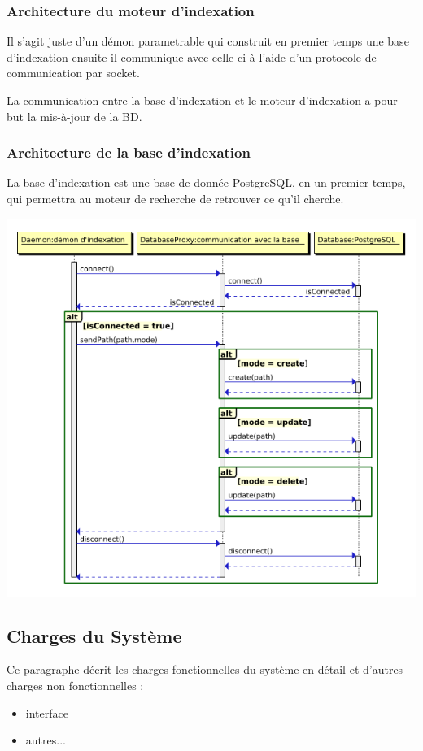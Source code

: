 \subsubsection{Architecture du moteur d'indexation}
Il s'agit juste d'un démon parametrable qui construit en premier temps une base d'indexation 
ensuite il communique avec celle-ci à l'aide d'un protocole de communication par socket.

La communication entre la base d'indexation et le moteur d'indexation a pour but la mis-à-jour de la BD.

\subsubsection{Architecture de la base d'indexation}
La base d'indexation est une base de donnée PostgreSQL, en un premier temps, qui permettra au moteur de recherche de retrouver ce qu'il cherche.

\begin{center}
\includegraphics[scale=0.5]{seqdbi.png}
\end{center}


\subsection{Charges du Système}
Ce paragraphe décrit les charges fonctionnelles du système en détail et d'autres charges non fonctionnelles : 
\begin{itemize}
 \item interface
 \item autres...
\end{itemize}

